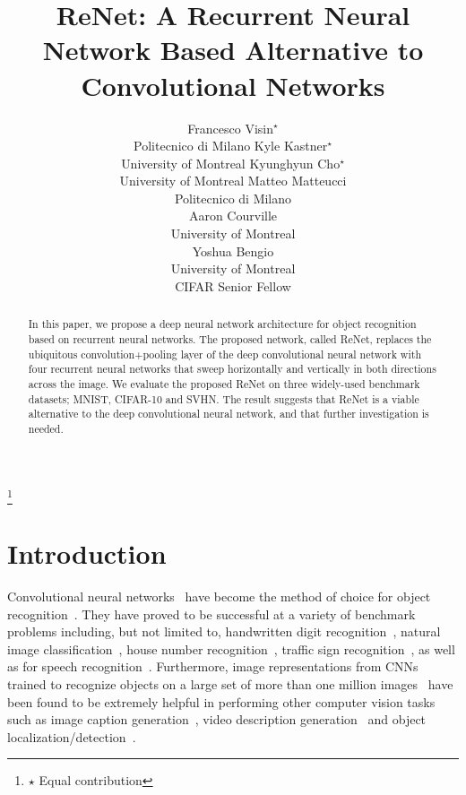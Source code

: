 \documentclass{article} \usepackage{nips15submit_e,times}
\title{ReNet: A Recurrent Neural Network Based Alternative to Convolutional Networks}
\author{
    Francesco Visin$^{\star}$ \\
    Politecnico di Milano
\And
    Kyle Kastner$^{\star}$ \\
    University of Montreal
\And
    Kyunghyun Cho$^{\star}$ \\
    University of Montreal
\And
    Matteo Matteucci \\
    Politecnico di Milano \\
\And
    Aaron Courville \\
    University of Montreal \\
\And
    Yoshua Bengio \\
    University of Montreal \\
    CIFAR Senior Fellow
}
\begin{document}
{
\let\thefootnote\relax\footnote{$\star$ Equal contribution}
}



\maketitle

\begin{abstract}
    In this paper, we propose a deep neural network architecture for object
    recognition based on recurrent neural networks. The proposed network, called
    ReNet, replaces the ubiquitous convolution+pooling layer of the deep
    convolutional neural network with four recurrent neural networks that sweep
    horizontally and vertically in both directions across the image. We evaluate
    the proposed ReNet on three widely-used benchmark datasets; MNIST, CIFAR-10 
    and SVHN. The result suggests that ReNet is a viable alternative to the deep
    convolutional neural network, and that further investigation is needed.
\end{abstract}

\section{Introduction}
Convolutional neural networks~\cite[CNN,][]{Fukushima80,LeCun89} have become the
method of choice for object recognition~\citep[see, e.g.,][]{Krizhevsky-2012}.
They have proved to be successful at a variety of benchmark problems including,
but not limited to, handwritten digit recognition~\citep[see,
e.g.,][]{Ciresan-2012}, natural image classification~\citep[see,
e.g.,][]{Lin2014,Simonyan2015,szegedy2014going}, house number 
recognition~\citep[see, e.g.,][]{Goodfellow+et+al-ICLR2014a}, traffic sign
recognition~\citep[see, e.g.,][]{Ciresan-et-al-2012}, as well as for speech 
recognition~\citep[see, e.g.,][]{Hamid2012, sainath2013, toth2014combining}. 
Furthermore, image representations from CNNs trained to recognize objects on a 
large set of more than one million images~\citep{Simonyan2015,szegedy2014going} 
have been found to be extremely helpful in performing other computer vision
tasks such as image caption generation~\citep[see,
e.g.,][]{Vinyals-et-al-arxiv2014,Xu-et-al-arxiv2015}, video description
generation~\citep[see, e.g.,][]{Li2015} and object
localization/detection~\citep[see, e.g.,][]{Sermanet14}.
\end{document}
